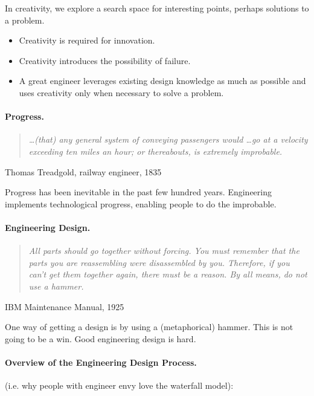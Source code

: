 In creativity, we explore a search space for interesting points, perhaps
solutions to a problem.
\begin{itemize}
\item Creativity is required for innovation.
\item Creativity introduces the possibility of failure.
\item A great engineer leverages existing design knowledge as
much as possible and uses creativity only when necessary to solve a problem.
\end{itemize}

\paragraph{Progress.}
\begin{quote} 
\textit{\ldots (that) any general system of conveying passengers would \ldots go at a velocity exceeding ten miles an hour; or thereabouts, is extremely improbable.}
\end{quote}
\hfill Thomas Treadgold, railway engineer, 1835

Progress has been inevitable in the past few hundred years. Engineering
implements technological progress, enabling people to do the improbable.

\paragraph{Engineering Design.}

\begin{quote}
\textit{All parts should go together without forcing.  You must remember that the parts you are reassembling were disassembled by you.  Therefore, if you can't get them together again, there must be a reason.  By all means, do not use a hammer.}
\end{quote}
\hfill IBM Maintenance Manual, 1925

One way of getting a design is by using a (metaphorical) hammer. This is
not going to be a win. Good engineering design is hard.

\paragraph{Overview of the Engineering Design Process.} (i.e. why
people with engineer envy love the waterfall model):


